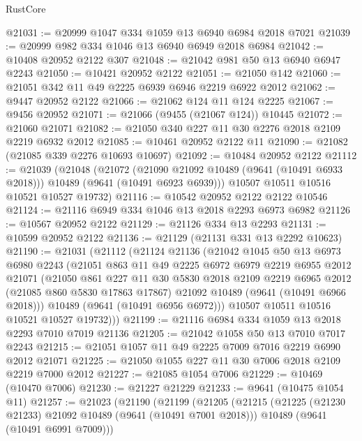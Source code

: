 \begin{lexlean}{RustCore}
\begin{coremodule}
@21031 := @20999 @1047 @334 @1059 @13 @6940 @6984 @2018 @7021
@21039 := @20999 @982 @334 @1046 @13 @6940 @6949 @2018 @6984
@21042 := @10408 @20952 @2122 @307
@21048 := @21042 @981 @50 @13 @6940 @6947 @2243
@21050 := @10421 @20952 @2122
@21051 := @21050 @142
@21060 := @21051 @342 @11 @49 @2225 @6939 @6946 @2219 @6922 @2012
@21062 := @9447 @20952 @2122
@21066 := @21062 @124 @11 @124 @2225
@21067 := @9456 @20952
@21071 := @21066 (@9455 (@21067 @124)) @10445
@21072 := @21060 @21071
@21082 := @21050 @340 @227 @11 @30 @2276 @2018 @2109 @2219 @6932 @2012
@21085 := @10461 @20952 @2122 @11
@21090 := @21082 (@21085 @339 @2276 @10693 @10697)
@21092 := @10484 @20952 @2122
@21112 := @21039
    (@21048
      (@21072
        (@21090 @21092 @10489 (@9641 (@10491 @6933 @2018)))
        @10489
        (@9641 (@10491 @6923 @6939)))
      @10507
      @10511
      @10516
      @10521
      @10527
      @19732)
@21116 := @10542 @20952 @2122 @2122 @10546
@21124 := @21116 @6949 @334 @1046 @13 @2018 @2293 @6973 @6982
@21126 := @10567 @20952 @2122
@21129 := @21126 @334 @13 @2293
@21131 := @10599 @20952 @2122
@21136 := @21129 (@21131 @331 @13 @2292 @10623)
@21190 := @21031
    (@21112
      (@21124
        @21136
        (@21042
          @1045
          @50
          @13
          @6973
          @6980
          @2243
          (@21051
            @863
            @11
            @49
            @2225
            @6972
            @6979
            @2219
            @6955
            @2012
            @21071
            (@21050
              @861
              @227
              @11
              @30
              @5830
              @2018
              @2109
              @2219
              @6965
              @2012
              (@21085 @860 @5830 @17863 @17867)
              @21092
              @10489
              (@9641 (@10491 @6966 @2018)))
            @10489
            (@9641 (@10491 @6956 @6972)))
          @10507
          @10511
          @10516
          @10521
          @10527
          @19732)))
@21199 := @21116 @6984 @334 @1059 @13 @2018 @2293 @7010 @7019 @21136
@21205 := @21042 @1058 @50 @13 @7010 @7017 @2243
@21215 := @21051 @1057 @11 @49 @2225 @7009 @7016 @2219 @6990 @2012 @21071
@21225 := @21050 @1055 @227 @11 @30 @7006 @2018 @2109 @2219 @7000 @2012
@21227 := @21085 @1054 @7006
@21229 := @10469 (@10470 @7006)
@21230 := @21227 @21229
@21233 := @9641 (@10475 @1054 @11)
@21257 := @21023
    (@21190
      (@21199
        (@21205
          (@21215
            (@21225 (@21230 @21233) @21092 @10489 (@9641 (@10491 @7001 @2018)))
            @10489
            (@9641 (@10491 @6991 @7009)))

\end{coremodule}
\end{lexlean}
